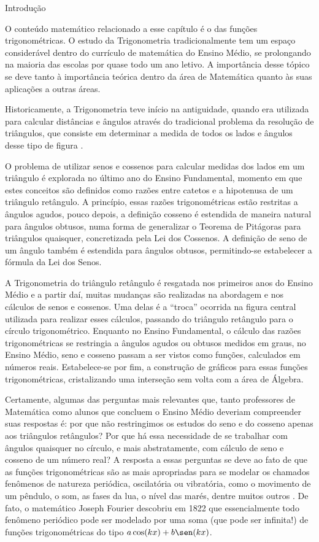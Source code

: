 \begin{apresentacao}{Introdução}

O conteúdo matemático relacionado a esse capítulo é o das funções trigonométricas. O estudo da Trigonometria tradicionalmente tem um espaço considerável dentro do currículo de matemática do Ensino Médio, se prolongando na maioria das escolas por quase todo um ano letivo. A importância desse tópico se deve tanto à importância teórica dentro da área de Matemática quanto às suas aplicações a outras áreas.

Historicamente, a Trigonometria teve início na antiguidade, quando era utilizada para calcular distâncias e ângulos através do tradicional problema da resolução de triângulos, que consiste em determinar a medida de todos os lados e ângulos desse tipo de figura \citep{Lima2006}.

O problema de utilizar senos e cossenos para calcular medidas dos lados em um triângulo é explorada no último ano do Ensino Fundamental, momento em que estes conceitos são definidos como razões entre catetos e a hipotenusa de um triângulo retângulo. A princípio, essas razões trigonométricas estão restritas a ângulos agudos, pouco depois, a definição cosseno é estendida de maneira natural para ângulos obtusos, numa forma de generalizar o Teorema de Pitágoras para triângulos quaisquer, concretizada pela Lei dos Cossenos. A definição de seno de um ângulo também é estendida para ângulos obtusos, permitindo-se estabelecer a fórmula da Lei dos Senos.

A Trigonometria do triângulo retângulo é resgatada nos primeiros anos do Ensino Médio e a partir daí, muitas mudanças são realizadas na abordagem e nos cálculos de senos e cossenos. Uma delas é a “troca”{} ocorrida na figura central utilizada para realizar esses cálculos, passando do triângulo retângulo para o círculo trigonométrico. Enquanto no Ensino Fundamental, o cálculo das razões trigonométricas se restringia a ângulos agudos ou obtusos medidos em graus, no Ensino Médio, seno e cosseno passam a ser vistos como funções, calculados em números reais. Estabelece-se por fim, a construção de gráficos para essas funções trigonométricas, cristalizando uma interseção sem volta com a área de Álgebra.  

Certamente, algumas das perguntas mais relevantes que, tanto professores de Matemática como alunos que concluem o Ensino Médio deveriam compreender suas respostas é: por que não restringimos os estudos do seno e do cosseno apenas aos triângulos retângulos? Por que há essa necessidade de se trabalhar com ângulos quaisquer no círculo, e mais abstratamente, com cálculo de seno e cosseno de um número real? A resposta a essas perguntas se deve ao fato de que as funções trigonométricas são as mais apropriadas para se modelar os chamados fenômenos de natureza periódica, oscilatória ou vibratória, como o movimento de um pêndulo, o som, as fases da lua, o nível das marés, dentre muitos outros \citep{Lima2006}. De fato, o matemático Joseph Fourier descobriu em 1822 que essencialmente todo fenômeno periódico pode ser modelado por uma soma (que pode ser infinita!) de funções trigonométricas do tipo $a\cos(kx)+b\sen(kx)$.


\end{apresentacao}
